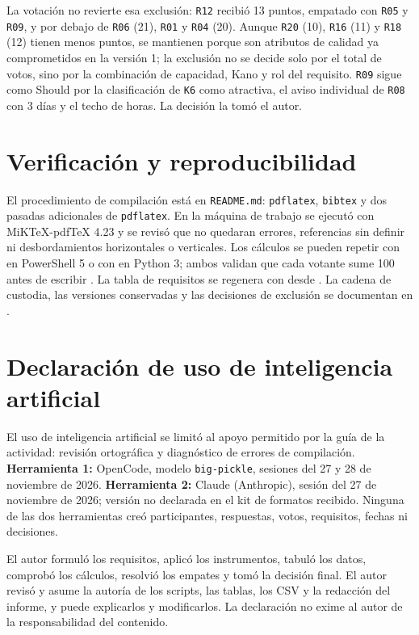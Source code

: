 \documentclass[11pt,a4paper]{article}
\begin{document}
La votación no revierte esa exclusión: \texttt{R12} recibió 13 puntos, empatado con \texttt{R05} y \texttt{R09}, y por debajo de \texttt{R06} (21), \texttt{R01} y \texttt{R04} (20). Aunque \texttt{R20} (10), \texttt{R16} (11) y \texttt{R18} (12) tienen menos puntos, se mantienen porque son atributos de calidad ya comprometidos en la versión 1; la exclusión no se decide solo por el total de votos, sino por la combinación de capacidad, Kano y rol del requisito. \texttt{R09} sigue como Should por la clasificación de \texttt{K6} como atractiva, el aviso individual de \texttt{R08} con 3 días y el techo de horas. La decisión la tomó el autor.

\section{Verificación y reproducibilidad}
El procedimiento de compilación está en \texttt{README.md}: \texttt{pdflatex}, \texttt{bibtex} y dos pasadas adicionales de \texttt{pdflatex}. En la máquina de trabajo se ejecutó con MiKTeX-pdfTeX 4.23 y se revisó que no quedaran errores, referencias sin definir ni desbordamientos horizontales o verticales. Los cálculos se pueden repetir con  en PowerShell 5 o con  en Python 3; ambos validan que cada votante sume 100 antes de escribir . La tabla de requisitos se regenera con  desde . La cadena de custodia, las versiones conservadas y las decisiones de exclusión se documentan en .

\section{Declaración de uso de inteligencia artificial}

El uso de inteligencia artificial se limitó al apoyo permitido por la guía de la actividad: revisión ortográfica y diagnóstico de errores de compilación. \textbf{Herramienta 1:} OpenCode, modelo \texttt{big-pickle}, sesiones del 27 y 28 de noviembre de 2026. \textbf{Herramienta 2:} Claude (Anthropic), sesión del 27 de noviembre de 2026; versión no declarada en el kit de formatos recibido. Ninguna de las dos herramientas creó participantes, respuestas, votos, requisitos, fechas ni decisiones.

El autor formuló los requisitos, aplicó los instrumentos, tabuló los datos, comprobó los cálculos, resolvió los empates y tomó la decisión final. El autor revisó y asume la autoría de los scripts, las tablas, los CSV y la redacción del informe, y puede explicarlos y modificarlos. La declaración no exime al autor de la responsabilidad del contenido.



\end{document}
